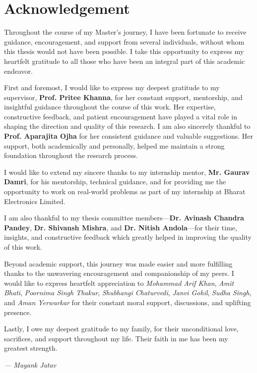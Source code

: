 \chapter*{Acknowledgement}

Throughout the course of my Master's journey, I have been fortunate to receive guidance, encouragement, and support from several individuals, without whom this thesis would not have been possible. I take this opportunity to express my heartfelt gratitude to all those who have been an integral part of this academic endeavor.

First and foremost, I would like to express my deepest gratitude to my supervisor, \textbf{Prof. Pritee Khanna}, for her constant support, mentorship, and insightful guidance throughout the course of this work. Her expertise, constructive feedback, and patient encouragement have played a vital role in shaping the direction and quality of this research. I am also sincerely thankful to \textbf{Prof. Aparajita Ojha} for her consistent guidance and valuable suggestions. Her support, both academically and personally, helped me maintain a strong foundation throughout the research process.

I would like to extend my sincere thanks to my internship mentor, \textbf{Mr. Gaurav Damri}, for his mentorship, technical guidance, and for providing me the opportunity to work on real-world problems as part of my internship at Bharat Electronics Limited.

I am also thankful to my thesis committee members—\textbf{Dr. Avinash Chandra Pandey}, \textbf{Dr. Shivansh Mishra}, and \textbf{Dr. Nitish Andola}—for their time, insights, and constructive feedback which greatly helped in improving the quality of this work.

Beyond academic support, this journey was made easier and more fulfilling thanks to the unwavering encouragement and companionship of my peers. I would like to express heartfelt appreciation to \textit{Mohammad Arif Khan}, \textit{Amit Bhati}, \textit{Poornima Singh Thakur}, \textit{Shubhangi Chaturvedi}, \textit{Janvi Gohil}, \textit{Sudha Singh}, and \textit{Aman Yerwarkar} for their constant moral support, discussions, and uplifting presence.

Lastly, I owe my deepest gratitude to my family, for their unconditional love, sacrifices, and support throughout my life. Their faith in me has been my greatest strength.

\bigskip

\hfill\textit{--- Mayank Jatav}
